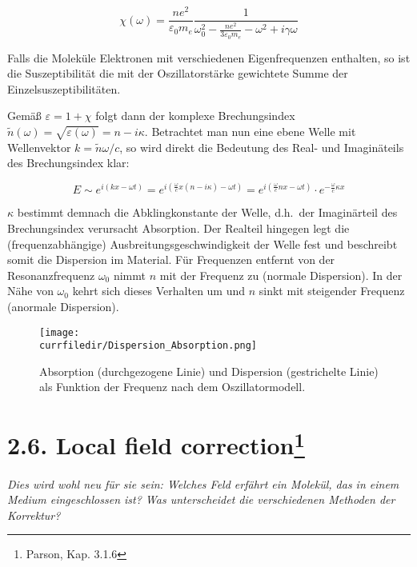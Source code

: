 \begin{equation}
    \chi(\omega) = \frac{n e^{2}}{\varepsilon_{0} m_{e}} \frac{1}{\omega_{0}^{2} - \frac{n e^{2}}{3 \varepsilon_{0} m_{e}} - \omega^{2} + i \gamma \omega}
\end{equation}

Falls die Moleküle Elektronen mit verschiedenen Eigenfrequenzen enthalten, so ist die Suszeptibilität die mit der Oszillatorstärke gewichtete Summe der Einzelsuszeptibilitäten.

Gemäß $\varepsilon = 1 + \chi$ folgt dann der komplexe Brechungsindex $\tilde{n}(\omega) = \sqrt{\varepsilon(\omega)} = n - i \kappa$. Betrachtet man nun eine ebene Welle mit Wellenvektor $k = \tilde{n}\omega/c$, so wird direkt die Bedeutung des Real- und Imaginäteils des Brechungsindex klar:

\begin{equation}
    E \sim e^{i(kx - \omega t)} = e^{i(\frac{\omega}{c}x (n-i\kappa) - \omega t)} = e^{i(\frac{\omega}{c}n x - \omega t)} \cdot e^{- \frac{\omega}{c} \kappa x}
\end{equation}

$\kappa$ bestimmt demnach die Abklingkonstante der Welle, d.h.\ der Imaginärteil des Brechungsindex verursacht Absorption. Der Realteil hingegen legt die (frequenzabhängige) Ausbreitungsgeschwindigkeit der Welle fest und beschreibt somit die Dispersion im Material. Für Frequenzen entfernt von der Resonanzfrequenz $\omega_{0}$ nimmt $n$ mit der Frequenz zu (normale Dispersion). In der Nähe von $\omega_{0}$ kehrt sich dieses Verhalten um und $n$ sinkt mit steigender Frequenz (anormale Dispersion).

\begin{figure}[htb]
    \centering
    \texttt{[image: \\currfiledir/Dispersion\_Absorption.png]}
    \caption{Absorption (durchgezogene Linie) und Dispersion (gestrichelte Linie) als Funktion der Frequenz nach dem Oszillatormodell.}
\end{figure}

\section{2.6. Local field correction\protect\footnote{Parson, Kap. 3.1.6}\hfill *} 

\textit{Dies wird wohl neu für sie sein: Welches Feld erfährt ein
Molekül, das in einem Medium eingeschlossen ist?  Was
unterscheidet die verschiedenen Methoden der Korrektur?}

